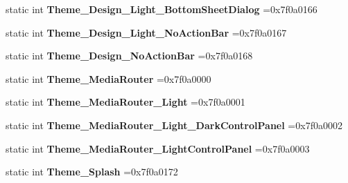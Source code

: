 \begin{DoxyCompactItemize}
static int {\bfseries Theme\+\_\+\+Design\+\_\+\+Light\+\_\+\+Bottom\+Sheet\+Dialog} =0x7f0a0166
\item 
\mbox{\label{classandroid_1_1support_1_1v7_1_1cardview_1_1R_1_1style_a347d06d58422649ccd8ca731cadcd448}} 
static int {\bfseries Theme\+\_\+\+Design\+\_\+\+Light\+\_\+\+No\+Action\+Bar} =0x7f0a0167
\item 
\mbox{\label{classandroid_1_1support_1_1v7_1_1cardview_1_1R_1_1style_a9446a9192c04835a34d4b3cd249ea50b}} 
static int {\bfseries Theme\+\_\+\+Design\+\_\+\+No\+Action\+Bar} =0x7f0a0168
\item 
\mbox{\label{classandroid_1_1support_1_1v7_1_1cardview_1_1R_1_1style_ad575eb4ccfe8d0a4e28cd700c8609498}} 
static int {\bfseries Theme\+\_\+\+Media\+Router} =0x7f0a0000
\item 
\mbox{\label{classandroid_1_1support_1_1v7_1_1cardview_1_1R_1_1style_a0ae5241353966cfefce589e3c5119a0e}} 
static int {\bfseries Theme\+\_\+\+Media\+Router\+\_\+\+Light} =0x7f0a0001
\item 
\mbox{\label{classandroid_1_1support_1_1v7_1_1cardview_1_1R_1_1style_a3d2a76e3ae17c0f27fc335af64554844}} 
static int {\bfseries Theme\+\_\+\+Media\+Router\+\_\+\+Light\+\_\+\+Dark\+Control\+Panel} =0x7f0a0002
\item 
\mbox{\label{classandroid_1_1support_1_1v7_1_1cardview_1_1R_1_1style_a890d5aefe3d53e583aeb920109b93667}} 
static int {\bfseries Theme\+\_\+\+Media\+Router\+\_\+\+Light\+Control\+Panel} =0x7f0a0003
\item 
\mbox{\label{classandroid_1_1support_1_1v7_1_1cardview_1_1R_1_1style_ad7c58926c29a47468a4d0fd6e2c317a3}} 
static int {\bfseries Theme\+\_\+\+Splash} =0x7f0a0172
\item 
\mbox{\label{classandroid_1_1support_1_1v7_1_1cardview_1_1R_1_1style_af28bd7eec0b693e1f824ab8345fec329}} 

\end{DoxyCompactItemize}
